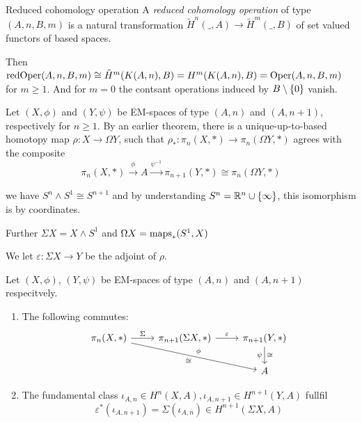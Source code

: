 \documentclass[language=english]{TemplateLecture}
\begin{document}
\begin{defi}{Reduced cohomology operation}{}
    A \emph{reduced cohomology operation} of type \((A,n,B,m)\) is a natural transformation \(\tilde H^n(\_,A)\to \tilde H^m(\_, B)\) of set valued functors of based spaces.
\end{defi}

Then \(\mathrm{red}\mathrm{Oper}(A,n,B,m)\cong \tilde H^m(K(A,n), B) = H^m(K(A,n), B) = \mathrm{Oper}(A,n,B,m)\) for \(m \geq 1\). And for \(m = 0\) the contsant operations induced by \(B\setminus\{0\}\) vanish.

\begin{construction}
    Let \((X,\phi)\) and \((Y, \psi)\) be EM-spaces of type \((A,n)\) and \((A, n+1)\), respectively for \(n\geq 1\). By an earlier theorem, there is a unique-up-to-based homotopy map \(\rho\colon X\to \Omega Y\), such that \(\rho_*\colon \pi_n(X,*)\to \pi_n(\Omega Y, *)\) agrees with the composite
    \[\pi_n(X,*)\xrightarrow{\phi}A \xrightarrow{\psi^{-1}} \pi_{n+1}( Y, *)\cong \pi_n(\Omega Y,*)\]
\end{construction}

we have \(S^n \wedge S^1 \cong S^{n+1}\) and by understanding \(S^n = \mathbb{R}^n\cup \{\infty\}\), this isomorphism is by coordinates.

Further \(\Sigma X = X\wedge S^1\) and \(\Omega X = \mathrm{maps}_*(S^1, X)\)

We let \(\varepsilon\colon \Sigma X\to Y\) be the adjoint of \(\rho\).

\begin{lem}{}{}
    Let \((X,\phi)\), \((Y, \psi)\) be EM-spaces of type \((A,n)\) and \((A,n+1)\) respecitvely.
    \begin{enumerate}
        \item The following commutes:
        \[\begin{tikzcd}
            \pi_n(X,*)\ar[r, "\Sigma"]\ar[rrd, "\phi", "\cong"'] & \pi_{n+1}(\Sigma X, *) \ar[r, "\varepsilon"] & \pi_{n+1}(Y, *) \ar[d, "\cong", "\psi"'] \\
            && A
        \end{tikzcd}\]
        \item The fundamental class \(\iota_{A,n}\in H^n(X,A), \iota_{A,n+1}\in H^{n+1}(Y,A)\) fullfil
        \[\varepsilon^*(\iota_{A,n+1}) = \Sigma(\iota_{A,n}) \in H^{n+1}(\Sigma X, A)\]
    \end{enumerate}
\end{lem}
\end{document}

